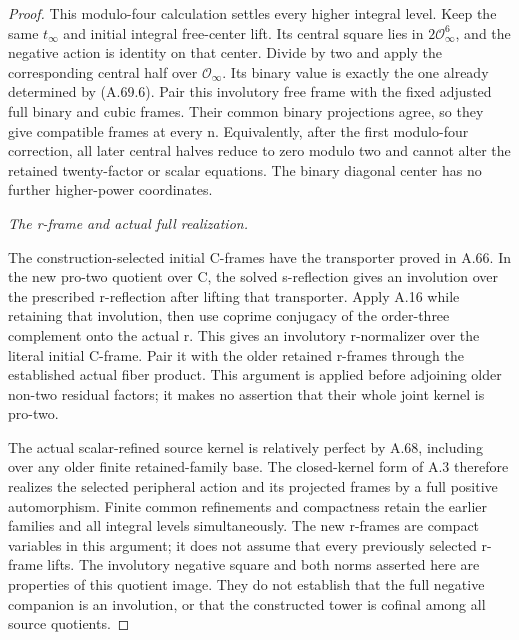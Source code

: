 \begin{proof}
This modulo-four calculation settles every higher integral level.
Keep the same \(t_\infty\) and initial integral free-center lift.
Its central square lies in \(2\mathcal O_\infty^6\), and the
negative action is identity on that center. Divide by two and
apply the corresponding central half over
\(\mathcal O_\infty\). Its binary value is exactly the one
already determined by (A.69.6). Pair this involutory free frame
with the fixed adjusted full binary and cubic frames. Their
common binary projections agree, so they give compatible frames
at every n. Equivalently, after the first modulo-four correction,
all later central halves reduce to zero modulo two and cannot
alter the retained twenty-factor or scalar equations. The binary
diagonal center has no further higher-power coordinates.

\emph{The r-frame and actual full realization.}\par
The construction-selected initial C-frames have the transporter
proved in A.66. In the new pro-two quotient over C, the solved
s-reflection gives an involution over the prescribed r-reflection
after lifting that transporter. Apply A.16 while retaining that
involution, then use coprime conjugacy of the order-three complement
onto the actual r. This gives an involutory r-normalizer over the
literal initial C-frame. Pair it with the older retained r-frames
through the established actual fiber product. This argument is
applied before adjoining older non-two residual factors; it makes
no assertion that their whole joint kernel is pro-two.

The actual scalar-refined source kernel is relatively perfect by
A.68, including over any older finite retained-family base.
The closed-kernel form of A.3 therefore realizes the selected
peripheral action and its projected frames by a full positive
automorphism. Finite common refinements and compactness retain
the earlier families and all integral levels simultaneously.
The new r-frames are compact variables in this argument; it
does not assume that every previously selected r-frame lifts. The involutory negative
square and both norms asserted here are properties of this
quotient image. They do not establish that the full negative
companion is an involution, or that the constructed tower is cofinal among all source
quotients.
\end{proof}
